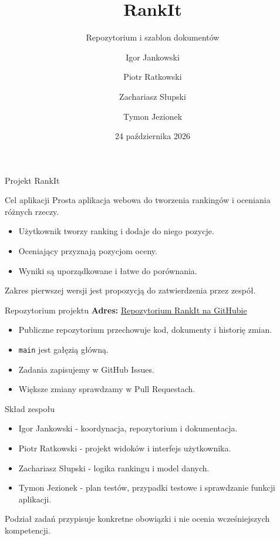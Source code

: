 \documentclass[aspectratio=169,11pt]{beamer}
\title{RankIt}
\subtitle{Repozytorium i szablon dokumentów}
\author{Igor Jankowski \and Piotr Ratkowski \and Zachariasz Słupski \and Tymon Jezionek}
\institute{Realizacja Projektu Informatycznego 2026/2027}
\date{24 października 2026}
\begin{document}
\begin{frame}[plain]
  \titlepage
\end{frame}

\begin{frame}{Projekt RankIt}
  \begin{block}{Cel aplikacji}
    Prosta aplikacja webowa do tworzenia rankingów i oceniania różnych rzeczy.
  \end{block}
  \begin{itemize}
    \item Użytkownik tworzy ranking i dodaje do niego pozycje.
    \item Oceniający przyznają pozycjom oceny.
    \item Wyniki są uporządkowane i łatwe do porównania.
  \end{itemize}
  \vfill
  \small Zakres pierwszej wersji jest propozycją do zatwierdzenia przez zespół.
\end{frame}

\begin{frame}{Repozytorium projektu}
  \textbf{Adres:} \href{https://github.com/elprofesoriqo/rpi}{Repozytorium RankIt na GitHubie}
  \vspace{0.6cm}
  \begin{itemize}
    \item Publiczne repozytorium przechowuje kod, dokumenty i historię zmian.
    \item \texttt{main} jest gałęzią główną.
    \item Zadania zapisujemy w GitHub Issues.
    \item Większe zmiany sprawdzamy w Pull Requestach.
  \end{itemize}
\end{frame}

\begin{frame}{Skład zespołu}
  \begin{itemize}
    \item Igor Jankowski - koordynacja, repozytorium i dokumentacja.
    \item Piotr Ratkowski - projekt widoków i interfejs użytkownika.
    \item Zachariasz Słupski - logika rankingu i model danych.
    \item Tymon Jezionek - plan testów, przypadki testowe i sprawdzanie funkcji aplikacji.
  \end{itemize}
  \small Podział zadań przypisuje konkretne obowiązki i nie ocenia wcześniejszych kompetencji.
\end{frame}
\end{document}
